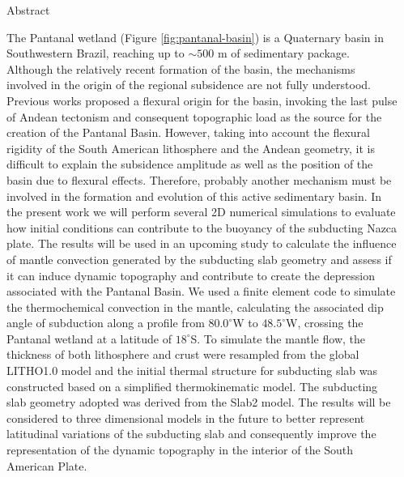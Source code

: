 \documentclass[final]{beamer}
\newlength{\sepwidth}
\newlength{\colwidth}
\newcommand{\separatorcolumn}{\begin{column}{\sepwidth}\end{column}}
\begin{document}

\begin{frame}[t]


\begin{columns}[t]
\separatorcolumn

\begin{column}{\colwidth}


  \begin{block}{Abstract}

    The Pantanal wetland (Figure \ref{fig:pantanal-basin}) is a Quaternary basin in Southwestern Brazil, reaching up to $\sim500$ m of sedimentary package. Although the relatively recent formation of the basin, the mechanisms involved in the origin of the regional subsidence are not fully understood. Previous works proposed a flexural origin for the basin, invoking the last pulse of Andean tectonism and consequent topographic load as the source for the creation of the Pantanal Basin. However, taking into account the flexural rigidity of the South American lithosphere and the Andean geometry, it is difficult to explain the subsidence amplitude as well as the position of the basin due to flexural effects. Therefore, probably another mechanism must be involved in the formation and evolution of this active sedimentary basin. In the present work we will perform several 2D numerical simulations to evaluate how initial conditions can contribute to the buoyancy of the subducting Nazca plate. The results will be used in an upcoming study to calculate the influence of mantle convection generated by the subducting slab geometry and assess if it can induce dynamic topography and contribute to create the depression associated with the Pantanal Basin. We used a finite element code to simulate the thermochemical convection in the mantle, calculating the associated dip angle of subduction along a profile from $80.0^{\circ}$W to $48.5^{\circ}$W, crossing the Pantanal wetland at a latitude of $18^{\circ}$S. To simulate the mantle flow, the thickness of both lithosphere and crust were resampled from the global LITHO1.0 model and the initial thermal structure for subducting slab was constructed based on a simplified thermokinematic model. The subducting slab geometry adopted was derived from the Slab2 model. The results will be considered to three dimensional models in the future to better represent latitudinal variations of the subducting slab and consequently improve the representation of the dynamic topography in the interior of the South American Plate.


\end{block}
\end{column}
\end{columns}
\end{frame}
\end{document}
